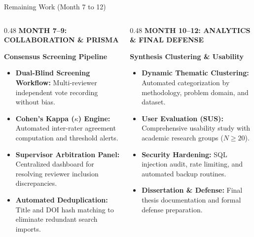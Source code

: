 \documentclass[aspectratio=169,10pt]{beamer}
\begin{document}
\begin{frame}{Remaining Work (Month 7 to 12)}
\vspace{-0.15cm}
\begin{columns}[T]
  \begin{column}{0.48\textwidth}
    {\fontsize{7.5pt}{9pt}\selectfont\bfseries\color{SubText} MONTH 7--9: COLLABORATION \& PRISMA}\par\vspace{3pt}
    {\fontsize{9.5pt}{11.5pt}\selectfont\bfseries\color{DarkText} Consensus Screening Pipeline}\par\vspace{4pt}
    {\fontsize{7.5pt}{9.5pt}\selectfont\color{DarkText}
    \begin{itemize}
      \item \textbf{Dual-Blind Screening Workflow:} Multi-reviewer independent vote recording without bias.
      \item \textbf{Cohen's Kappa ($\kappa$) Engine:} Automated inter-rater agreement computation and threshold alerts.
      \item \textbf{Supervisor Arbitration Panel:} Centralized dashboard for resolving reviewer inclusion discrepancies.
      \item \textbf{Automated Deduplication:} Title and DOI hash matching to eliminate redundant search imports.
    \end{itemize}}
  \end{column}

  \begin{column}{0.48\textwidth}
    {\fontsize{7.5pt}{9pt}\selectfont\bfseries\color{SubText} MONTH 10--12: ANALYTICS \& FINAL DEFENSE}\par\vspace{3pt}
    {\fontsize{9.5pt}{11.5pt}\selectfont\bfseries\color{DarkText} Synthesis Clustering \& Usability}\par\vspace{4pt}
    {\fontsize{7.5pt}{9.5pt}\selectfont\color{DarkText}
    \begin{itemize}
      \item \textbf{Dynamic Thematic Clustering:} Automated categorization by methodology, problem domain, and dataset.
      \item \textbf{User Evaluation (SUS):} Comprehensive usability study with academic research groups ($N \ge 20$).
      \item \textbf{Security Hardening:} SQL injection audit, rate limiting, and automated backup routines.
      \item \textbf{Dissertation \& Defense:} Final thesis documentation and formal defense preparation.
    \end{itemize}}
  \end{column}
\end{columns}


\end{frame}
\end{document}
